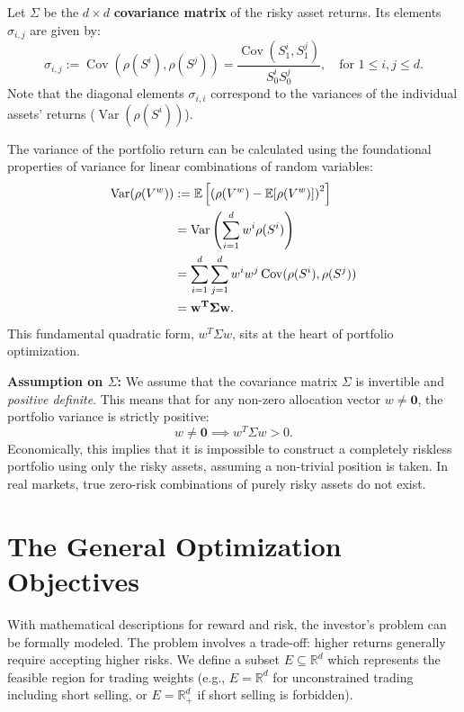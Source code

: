 Let $\Sigma$ be the $d \times d$ \textbf{covariance matrix} of the risky asset returns. Its elements $\sigma_{i,j}$ are given by:
\begin{equation}
    \sigma_{i,j} := \operatorname{Cov}(\rho(S^i), \rho(S^j)) = \frac{\operatorname{Cov}(S_1^i, S_1^j)}{S_0^i S_0^j}, \quad \text{for } 1 \leq i, j \leq d.
\end{equation}
Note that the diagonal elements $\sigma_{i,i}$ correspond to the variances of the individual assets' returns ($\operatorname{Var}(\rho(S^i))$).

The variance of the portfolio return can be calculated using the foundational properties of variance for linear combinations of random variables:
\begin{align}
    \operatorname{Var}(\rho(V^w)) &:= \mathbb{E}\left[ \left( \rho(V^w) - \mathbb{E}[\rho(V^w)] \right)^2 \right] \notag \\
    &= \operatorname{Var}\left( \sum_{i=1}^d w^i \rho(S^i) \right) \notag \\
    &= \sum_{i=1}^d \sum_{j=1}^d w^i w^j \operatorname{Cov}(\rho(S^i), \rho(S^j)) \notag \\
    &= \mathbf{w^T \Sigma w}. \label{eq:portfolio_variance}
\end{align}
This fundamental quadratic form, $w^T \Sigma w$, sits at the heart of portfolio optimization.

\vspace{0.3cm}
\textbf{Assumption on $\Sigma$:} We assume that the covariance matrix $\Sigma$ is invertible and \textit{positive definite}. This means that for any non-zero allocation vector $w \neq \mathbf{0}$, the portfolio variance is strictly positive:
\begin{equation*}
    w \neq \mathbf{0} \implies w^T \Sigma w > 0.
\end{equation*}
Economically, this implies that it is impossible to construct a completely riskless portfolio using only the risky assets, assuming a non-trivial position is taken. In real markets, true zero-risk combinations of purely risky assets do not exist.

\section{The General Optimization Objectives}

With mathematical descriptions for reward and risk, the investor's problem can be formally modeled. The problem involves a trade-off: higher returns generally require accepting higher risks. We define a subset $E \subseteq \mathbb{R}^d$ which represents the feasible region for trading weights (e.g., $E = \mathbb{R}^d$ for unconstrained trading including short selling, or $E = \mathbb{R}^d_+$ if short selling is forbidden).

